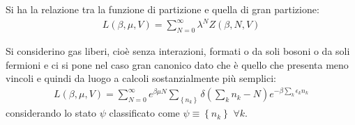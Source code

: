 Si ha la relazione tra la funzione di partizione e quella di gran partizione:
\begin{equation}\begin{split}
L\left(\beta,\mu,V\right)=\sum_{N=0}^{\infty }{\lambda^NZ\left(\beta,N,V\right)}
\end{split}\end{equation}

Si considerino gas liberi, cioè senza interazioni, formati o da soli bosoni o da soli fermioni e ci si pone nel caso gran canonico dato che è quello che presenta meno vincoli e quindi da luogo a calcoli sostanzialmente più semplici:
\begin{equation}\begin{split}
L\left(\beta,\mu,V\right)=\sum_{N=0}^{\infty }{e^{\beta\mu N}}\sum_{\left\{n_k\right\}}{\delta\left(\sum_k{n_k-N}\right)e^{-\beta \sum_k{\epsilon_kn_k}}}
\end{split}\end{equation}
considerando lo stato $\psi $ classificato come $\psi \equiv \left\{n_k\right\}$ $\forall k$.

%